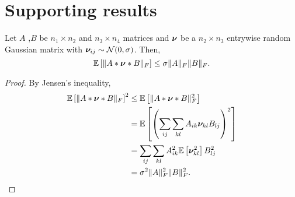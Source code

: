 \documentclass{article}
\begin{document}
\section{Supporting results}


\begin{lem}\label{lem:gauss_product}
Let $A$ ,$B$ be $n_1 \times n_2$ and $n_3 \times n_4$ matrices and $\boldsymbol{\nu}$ be a $n_2\times n_3$ entrywise random Gaussian matrix with $\boldsymbol{\nu}_{ij} \sim \mathcal{N}(0,\sigma)$. Then,
$$\mathbb{E} \left[\| A*\boldsymbol{\nu}*B\|_F \right] \leq \sigma \|A\|_F  \|B\|_F .$$
\end{lem}
\begin{proof}
By Jensen's inequality, 
\begin{align*}
\mathbb{E} \left[\| A*\boldsymbol{\nu}*B\|_F \right]^2 &\leq \mathbb{E} \left[\| A*\boldsymbol{\nu}*B\|_F^2 \right] \\
&= \mathbb{E} \left[\left(\sum_{ij} \sum_{kl} A_{ik} \boldsymbol{\nu}_{kl} B_{lj} \right)^2 \right]\\
&= \sum_{ij} \sum_{kl} A_{ik}^2 \mathbb{E} \left[\boldsymbol{\nu}_{kl}^2\right] B_{lj}^2 \\
&= \sigma^2 \|A\|_F^2 \| B\|_F^2.
\end{align*}

\end{proof}

\end{document}
